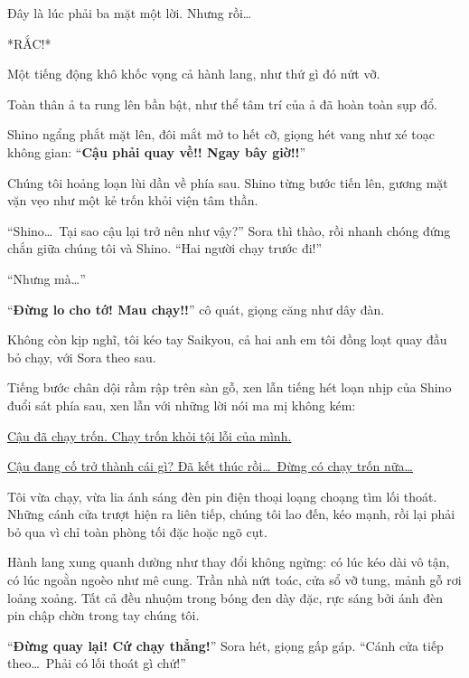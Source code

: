 \documentclass[../main.tex]{subfiles}
\begin{document}
Đây là lúc phải ba mặt một lời. Nhưng rồi\dots

*RẮC!*

Một tiếng động khô khốc vọng cả hành lang, như thứ gì đó nứt vỡ.

Toàn thân ả ta rung lên bần bật, như thể tâm trí của ả đã hoàn toàn sụp đổ.

Shino ngẩng phắt mặt lên, đôi mắt mở to hết cỡ, giọng hét vang như xé toạc không gian: ``\textbf{Cậu phải quay về!! Ngay bây giờ!!}''


Chúng tôi hoảng loạn lùi dần về phía sau. Shino từng bước tiến lên, gương mặt vặn vẹo như một kẻ trốn khỏi viện tâm thần.

``Shino\dots\ Tại sao cậu lại trở nên như vậy?'' Sora thì thào, rồi nhanh chóng đứng chắn giữa chúng tôi và Shino. ``Hai người chạy trước đi!''

``Nhưng mà\dots''

``\textbf{Đừng lo cho tớ! Mau chạy!!}'' cô quát, giọng căng như dây đàn.

Không còn kịp nghĩ, tôi kéo tay Saikyou, cả hai anh em tôi đồng loạt quay đầu bỏ chạy, với Sora theo sau.

Tiếng bước chân dội rầm rập trên sàn gỗ, xen lẫn tiếng hét loạn nhịp của Shino đuổi sát phía sau, xen lẫn với những lời nói ma mị không kém:

\begin{center}
  \uline{Cậu đã chạy trốn. Chạy trốn khỏi tội lỗi của mình.}
\end{center}

\begin{center}
  \uline{Cậu đang cố trở thành cái gì? Đã kết thúc rồi\dots\ Đừng có chạy trốn nữa\dots}
\end{center}

Tôi vừa chạy, vừa lia ánh sáng đèn pin điện thoại loạng choạng tìm lối thoát. Những cánh cửa trượt hiện ra liên tiếp, chúng tôi lao đến, kéo mạnh, rồi lại phải bỏ qua vì chỉ toàn phòng tối đặc hoặc ngõ cụt.

Hành lang xung quanh dường như thay đổi không ngừng: có lúc kéo dài vô tận, có lúc ngoằn ngoèo như mê cung. Trần nhà nứt toác, cửa sổ vỡ tung, mảnh gỗ rơi loảng xoảng. Tất cả đều nhuộm trong bóng đen dày đặc, rực sáng bởi ánh đèn pin chập chờn trong tay chúng tôi.

``\textbf{Đừng quay lại! Cứ chạy thẳng!}'' Sora hét, giọng gấp gáp. ``Cánh cửa tiếp theo\dots\ Phải có lối thoát gì chứ!''
\end{document}
